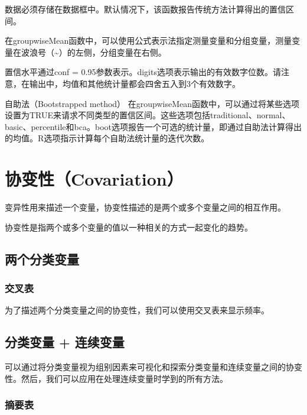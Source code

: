 \documentclass[]{book}
\begin{document}
数据必须存储在数据框中。默认情况下，该函数报告传统方法计算得出的置信区间。

在groupwiseMean函数中，可以使用公式表示法指定测量变量和分组变量，测量变量在波浪号（\textasciitilde{}）的左侧，分组变量在右侧。

置信水平通过conf = 0.95参数表示。digits选项表示输出的有效数字位数。请注意，在输出中，均值和其他统计量都会四舍五入到3个有效数字。

自助法（Bootstrapped method）
在groupwiseMean函数中，可以通过将某些选项设置为TRUE来请求不同类型的置信区间。这些选项包括traditional、normal、basic、percentile和bca。boot选项报告一个可选的统计量，即通过自助法计算得出的均值。R选项指示计算每个自助法统计量的迭代次数。

\hypertarget{ux534fux53d8ux6027covariation}{%
\section{协变性（Covariation）}\label{ux534fux53d8ux6027covariation}}

变异性用来描述一个变量，协变性描述的是两个或多个变量之间的相互作用。

协变性是指两个或多个变量的值以一种相关的方式一起变化的趋势。

\hypertarget{ux4e24ux4e2aux5206ux7c7bux53d8ux91cf}{%
\subsection{两个分类变量}\label{ux4e24ux4e2aux5206ux7c7bux53d8ux91cf}}

\hypertarget{ux4ea4ux53c9ux8868}{%
\subsubsection{交叉表}\label{ux4ea4ux53c9ux8868}}

为了描述两个分类变量之间的协变性，我们可以使用交叉表来显示频率。

\hypertarget{ux5206ux7c7bux53d8ux91cf-ux8fdeux7eedux53d8ux91cf}{%
\subsection{分类变量 + 连续变量}\label{ux5206ux7c7bux53d8ux91cf-ux8fdeux7eedux53d8ux91cf}}

可以通过将分类变量视为组别因素来可视化和探索分类变量和连续变量之间的协变性。然后，我们可以应用在处理连续变量时学到的所有方法。

\hypertarget{ux6458ux8981ux8868}{%
\subsubsection{摘要表}\label{ux6458ux8981ux8868}}
\end{document}
